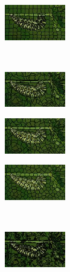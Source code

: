 \begin{figure}
\begin{subfigure}[b]{0.141\textwidth}
	\end{subfigure}
	\begin{subfigure}[b]{0.141\textwidth}
		\includegraphics[height=1.525cm]{pictures/compactness/bsds500/vlslic/score/80/cropped/vlslic_35028_contours}
	\end{subfigure}\\
	\begin{subfigure}[b]{0.02\textwidth}
	\end{subfigure}
	\begin{subfigure}[b]{0.141\textwidth}
		\includegraphics[height=1.525cm]{pictures/compactness/bsds500/crs/score/0.001/cropped/crs_35028_contours}
	\end{subfigure}
	\begin{subfigure}[b]{0.141\textwidth}
		\includegraphics[height=1.525cm]{pictures/compactness/bsds500/crs/score/0.01/cropped/crs_35028_contours}
	\end{subfigure}
	\begin{subfigure}[b]{0.141\textwidth}
		\includegraphics[height=1.525cm]{pictures/compactness/bsds500/crs/score/0.1/cropped/crs_35028_contours}
	\end{subfigure}\\
	\begin{subfigure}[b]{0.02\textwidth}
	\end{subfigure}
	\begin{subfigure}[b]{0.141\textwidth}
		\includegraphics[height=1.525cm]{pictures/compactness/bsds500/reseeds/score/0.0/cropped/reseeds_35028_contours}

\end{subfigure}
\end{figure}
